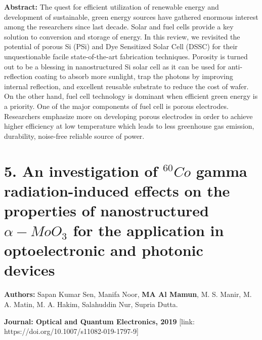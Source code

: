 \documentclass[a4paper,20pt]{article}
\begin{document}
    \begin{minipage}{.98\linewidth} \begin{flushleft}
    
    		\textbf{Abstract:} The quest for efficient utilization of renewable energy and development of sustainable, green energy sources have gathered enormous interest among the researchers since last decade. Solar and fuel cells provide a key solution to conversion and storage of energy. In this review, we revisited the potential of porous Si (PSi) and Dye Sensitized Solar Cell (DSSC) for their unquestionable facile state-of-the-art fabrication techniques. Porosity is turned out to be a blessing in nanostructured Si solar cell as it can be used for anti-reflection coating to absorb more sunlight, trap the photons by improving internal reflection, and excellent reusable substrate to reduce the cost of wafer. On the other hand, fuel cell technology is dominant when efficient green energy is a priority. One of the major components of fuel cell is porous electrodes. Researchers emphasize more on developing porous electrodes in order to achieve higher efficiency at low temperature which leads to less greenhouse gas emission, durability, noise-free reliable source of power.
    	\end{flushleft} \end{minipage}

\vspace{5pt}

\section{\textbf{5. An investigation of $^{60}Co$ gamma radiation-induced effects on the properties of nanostructured $\alpha-MoO_{3}$ for the application in optoelectronic and photonic devices}}

\textbf{Authors:} Sapan Kumar Sen, Manifa Noor, \textbf{MA Al Mamun}, M. S. Manir, M. A. Matin, M. A. Hakim, Salahuddin Nur, Supria Dutta. \\ \vspace{3pt}

\textbf{Journal: Optical and Quantum Electronics, 2019} [link: https://doi.org/10.1007/s11082-019-1797-9] \\ \vspace{-5pt}
\end{document}
